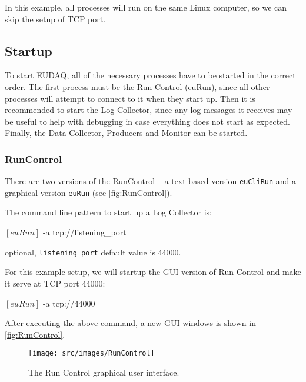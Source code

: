 In this example, all processes will run on the same Linux computer, so we can skip the setup of TCP port.

\subsection{Startup}
To start EUDAQ, all of the necessary processes have to be started in the correct order.
The first process must be the Run Control (euRun),
since all other processes will attempt to connect to it when they start up.
Then it is recommended to start the Log Collector,
since any log messages it receives may be useful
to help with debugging in case everything does not start as expected.
Finally, the Data Collector, Producers and Monitor can be started.

\subsubsection{RunControl}
\label{sec:runcontrol}
There are two versions of the RunControl -- a text-based version \texttt{euCliRun} and a graphical version \texttt{euRun} (see \autoref{fig:RunControl}).

The command line pattern to start up a Log Collector is:
\begin{listing}[mybash]
$[euRun]$ -a tcp://{listening_port}
\end{listing}

\begin{description}
optional, \texttt{listening\_port} default value is 44000.
\end{description}

For this example setup, we will startup the GUI version of Run Control and make it serve at TCP port 44000:\\
\begin{listing}[mybash]
$[euRun]$ -a tcp://44000
\end{listing}

After executing the above command, a new GUI windows is shown in \autoref{fig:RunControl}.
\begin{figure}[htb]
  \begin{center}
    \texttt{[image: src/images/RunControl]}
    \caption{The Run Control graphical user interface.}
    \label{fig:RunControl}
  \end{center}
\end{figure}

